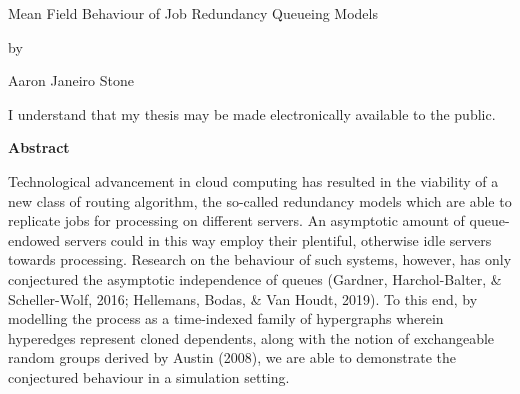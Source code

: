 \pagestyle{empty}


\begin{titlepage}
    \begin{center}
        \vspace*{1.0cm}

        \Huge Mean Field Behaviour of Job Redundancy Queueing Models

        \vspace*{1.0cm}

        \normalsize
        by \\

        \vspace*{1.0cm}

        \Large
        Aaron Janeiro Stone \\

        \vspace*{3.0cm}


    \end{center}
\end{titlepage}

\pagestyle{plain}
\setcounter{page}{2}

\cleardoublepage %




\bigskip

\noindent
I understand that my thesis may be made electronically available to the public.

\cleardoublepage


\begin{center}
    \textbf{Abstract}
\end{center}
Technological advancement in cloud computing has resulted in the viability of a new class of
routing algorithm, the so-called redundancy models which are able to replicate jobs for processing on different
servers. An asymptotic amount of queue-endowed servers could in this way employ their plentiful, otherwise
idle servers towards processing.
Research on the behaviour of such systems, however, has only conjectured
the asymptotic independence of queues (Gardner, Harchol-Balter, \& Scheller-Wolf, 2016; Hellemans, Bodas,
\& Van Houdt, 2019).
To this end, by modelling the process as a time-indexed family of hypergraphs wherein
hyperedges represent cloned dependents,  along with the notion of exchangeable
random groups derived by Austin (2008), we are able to demonstrate the conjectured behaviour in a simulation setting.


